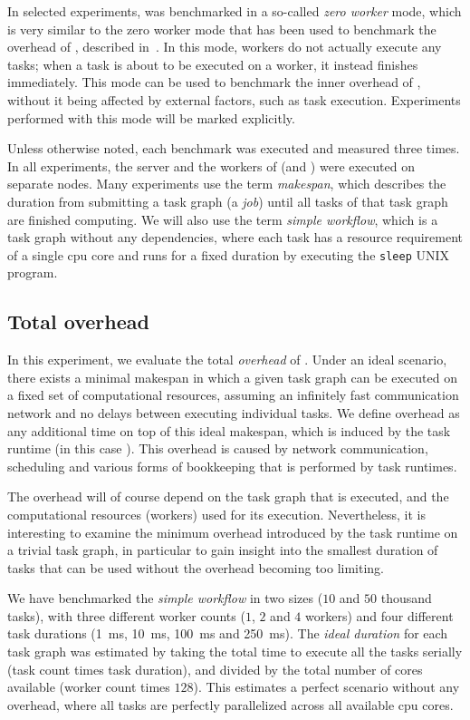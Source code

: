 In selected experiments, \hq{} was benchmarked in a so-called
\emph{zero worker} mode, which is very similar to the zero worker mode that has been used to
benchmark the overhead of \rsds{}, described in~. In this
mode, workers do not actually execute any tasks; when a task is about to be executed on a worker,
it instead finishes immediately. This mode can be used to benchmark the inner overhead of
\hyperqueue{}, without it being affected by external factors, such as task execution.
Experiments performed with this mode will be marked explicitly.

Unless otherwise noted, each benchmark was executed and measured three times. In all experiments,
the server and the workers of \hyperqueue{} (and \dask{}) were executed on separate nodes. Many
experiments use the term \emph{makespan}, which describes the duration from submitting a
task graph (a \hyperqueue{} \emph{job}) until all tasks of that task graph
are finished computing. We will also use the term \emph{simple workflow}, which is a task graph
without any dependencies, where each task has a resource requirement of a single
\gls{cpu} core and runs for a fixed duration by executing the \texttt{sleep}
UNIX program.

\subsection{Total overhead}
\label{sec:hq-exp-total-overhead}
In this experiment, we evaluate the total \emph{overhead} of \hyperqueue{}. Under
an ideal scenario, there exists a minimal makespan in which a given task graph can be executed on a
fixed set of computational resources, assuming an infinitely fast communication network and no
delays between executing individual tasks. We define overhead as any additional time on top of this
ideal makespan, which is induced by the task runtime (in this case \hyperqueue{}). This
overhead is caused by network communication, scheduling and various forms of bookkeeping that is
performed by task runtimes.

The overhead will of course depend on the task graph that is executed, and the computational
resources (workers) used for its execution. Nevertheless, it is interesting to examine the minimum
overhead introduced by the task runtime on a trivial task graph, in particular to gain insight into
the smallest duration of tasks that can be used without the overhead becoming too limiting.

We have benchmarked the \emph{simple workflow} in two sizes ($10$ and
$50$ thousand tasks), with three different worker counts ($1$,
$2$ and $4$ workers) and four different task durations
(\SI{1}{\milli\second}, \SI{10}{\milli\second}, \SI{100}{\milli\second} and
\SI{250}{\milli\second}). The \emph{ideal duration} for each task graph was estimated by taking
the total time to execute all the tasks serially (task count times task duration), and divided by
the total number of cores available (worker count times $128$). This estimates a
perfect scenario without any overhead, where all tasks are perfectly parallelized across all
available \gls{cpu} cores.


